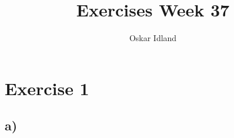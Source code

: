 \documentclass{article}
\author{Oskar Idland}
\title{Exercises Week 37}
\date{}
\begin{document}
\maketitle
\newpage
\section*{Exercise 1}
\subsection*{a)}
\end{document}
